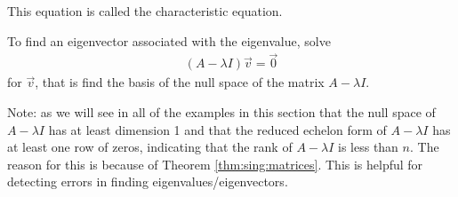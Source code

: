 This equation is called the characteristic equation.  

To find an eigenvector associated with the eigenvalue, solve 
% 
\begin{align*}
 (A - \lambda I) \vec{v} = \vec{0} 
\end{align*}
for $\vec{v}$, that is find the basis of the null space of the matrix $A - \lambda I$. 

Note: as we will see in all of the examples in this section that the null space of $A-\lambda I$ has at least dimension 1 and that the reduced echelon form of $A-\lambda I$ has at least one row of zeros, indicating that the rank of $A-\lambda I$ is less than $n$.   The reason for this is because of Theorem \ref{thm:sing:matrices}.  This is helpful for detecting errors in finding eigenvalues/eigenvectors.  

